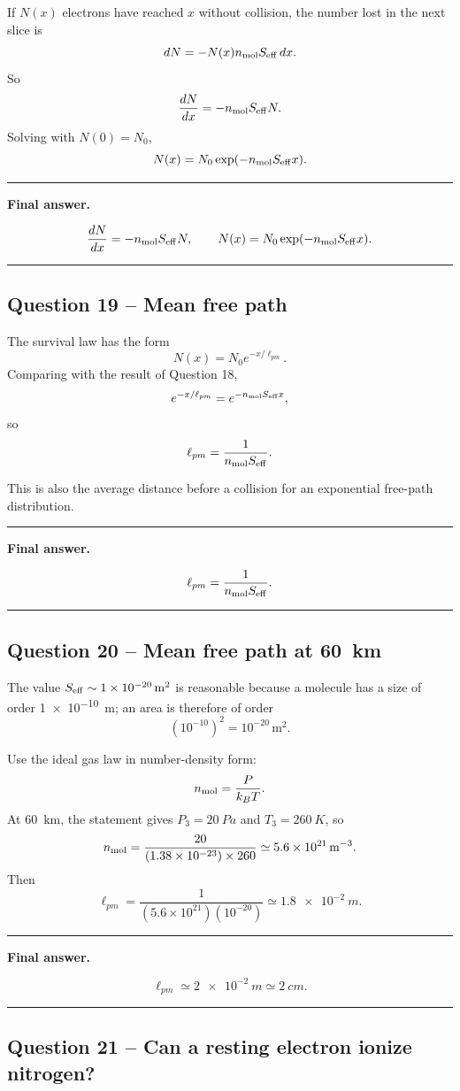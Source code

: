 \documentclass[11pt,a4paper]{article}
\newenvironment{finalanswer}{%
  \begin{center}\begin{minipage}{0.94\linewidth}\hrule\vspace{0.45em}\textbf{Final answer. }%
}{%
  \vspace{0.45em}\hrule\end{minipage}\end{center}%
}
\begin{document}
If $N(x)$ electrons have reached $x$ without collision, the number lost in the next slice is
\[
 dN=-N(x)n_{\rm mol}S_{\rm eff}\,dx.
\]
So
\[
 \frac{dN}{dx}=-n_{\rm mol}S_{\rm eff}N.
\]
Solving with $N(0)=N_0$,
\[
 N(x)=N_0\exp(-n_{\rm mol}S_{\rm eff}x).
\]

\begin{finalanswer}
\[
\frac{dN}{dx}=-n_{\rm mol}S_{\rm eff}N,
\qquad
N(x)=N_0\exp(-n_{\rm mol}S_{\rm eff}x).
\]
\end{finalanswer}

\subsection*{Question 19 -- Mean free path}

The survival law has the form
\[
 N(x)=N_0e^{-x/\ell_{pm}}.
\]
Comparing with the result of Question 18,
\[
 e^{-x/\ell_{pm}}=e^{-n_{\rm mol}S_{\rm eff}x},
\]
so
\[
 \ell_{pm}=\frac{1}{n_{\rm mol}S_{\rm eff}}.
\]

This is also the average distance before a collision for an exponential free-path distribution.

\begin{finalanswer}
\[
\ell_{pm}=\frac{1}{n_{\rm mol}S_{\rm eff}}.
\]
\end{finalanswer}

\subsection*{Question 20 -- Mean free path at \SI{60}{km}}

The value $S_{\rm eff}\sim\SI{1e-20}{m^2}$ is reasonable because a molecule has a size of order \SI{1e-10}{m}; an area is therefore of order
\[
 (10^{-10})^2=10^{-20}\,\mathrm{m^2}.
\]

Use the ideal gas law in number-density form:
\[
 n_{\rm mol}=\frac{P}{k_BT}.
\]
At \SI{60}{km}, the statement gives $P_3=\SI{20}{Pa}$ and $T_3=\SI{260}{K}$, so
\[
 n_{\rm mol}=\frac{20}{(1.38\times10^{-23})\times260}
 \simeq\SI{5.6e21}{m^{-3}}.
\]
Then
\[
 \ell_{pm}=\frac{1}{(5.6\times10^{21})(10^{-20})}
 \simeq\SI{1.8e-2}{m}.
\]

\begin{finalanswer}
\[
\ell_{pm}\simeq\SI{2e-2}{m}\simeq\SI{2}{cm}.
\]
\end{finalanswer}

\subsection*{Question 21 -- Can a resting electron ionize nitrogen?}
\end{document}
